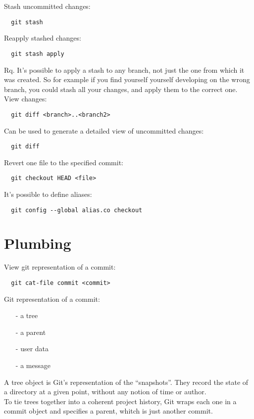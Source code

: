 \documentclass[french]{article}
\begin{document}
Stash uncommitted changes:
\begin{verbatim}
  git stash
\end{verbatim}

Reapply stashed changes:
\begin{verbatim}
  git stash apply
\end{verbatim}
Rq. It's possible to apply a stash to any branch, not just the one from which it was created. So for example if you find yourself yourself developing on the wrong branch, you could stash all your changes, and apply them to the correct one.\\

View changes:
\begin{verbatim}
  git diff <branch>..<branch2>
\end{verbatim}

Can be used to generate a detailed view of uncommitted changes:
\begin{verbatim}
  git diff
\end{verbatim}

Revert one file to the specified commit:
\begin{verbatim}
  git checkout HEAD <file>
\end{verbatim}

It's possible to define aliases:
\begin{verbatim}
  git config --global alias.co checkout
\end{verbatim}

\section{Plumbing}

View git representation of a commit:
\begin{verbatim}
  git cat-file commit <commit>
\end{verbatim}

Git representation of a commit:
\begin{itemize}
  \item [-] a tree
  \item [-] a parent
  \item [-] user data
  \item [-] a message
\end{itemize}
$ $\\
A tree object is Git's representation of the ``snapshots''. They record the state of a directory at a given point, without any notion of time or author.\\
To tie trees together into a coherent project history, Git wraps each one in a commit object and specifies a parent, whitch is just another commit.\\
\end{document}
